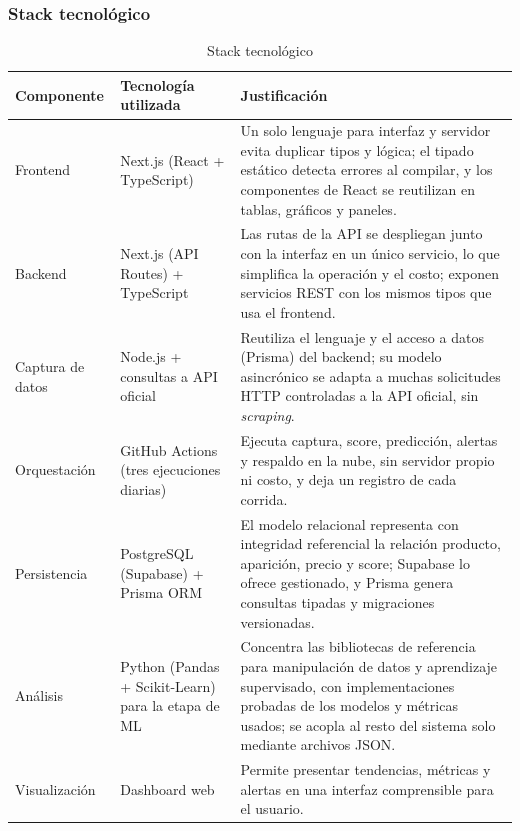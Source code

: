 \subsubsection{Stack tecnológico}\label{sec:stack-preliminar}

\begin{table}[ht]
	\centering
	\caption{Stack tecnológico}
	\label{tab:stack}
	\begin{tabularx}{\textwidth}{@{}>{\raggedright\arraybackslash}p{2.6cm} >{\raggedright\arraybackslash}p{4.2cm} X@{}}
		\toprule
		\textbf{Componente} & \textbf{Tecnología utilizada} & \textbf{Justificación} \\
		\midrule
		Frontend & Next.js (React + TypeScript) & Un solo lenguaje para interfaz y servidor evita duplicar tipos y lógica; el tipado estático detecta errores al compilar, y los componentes de React se reutilizan en tablas, gráficos y paneles. \\
		Backend & Next.js (API Routes) + TypeScript & Las rutas de la API se despliegan junto con la interfaz en un único servicio, lo que simplifica la operación y el costo; exponen servicios REST con los mismos tipos que usa el frontend. \\
		Captura de datos & Node.js + consultas a API oficial & Reutiliza el lenguaje y el acceso a datos (Prisma) del backend; su modelo asincrónico se adapta a muchas solicitudes HTTP controladas a la API oficial, sin \emph{scraping}. \\
		Orquestación & GitHub Actions (tres ejecuciones diarias) & Ejecuta captura, score, predicción, alertas y respaldo en la nube, sin servidor propio ni costo, y deja un registro de cada corrida. \\
		Persistencia & PostgreSQL (Supabase) + Prisma ORM & El modelo relacional representa con integridad referencial la relación producto, aparición, precio y score; Supabase lo ofrece gestionado, y Prisma genera consultas tipadas y migraciones versionadas. \\
		Análisis & Python (Pandas + Scikit-Learn) para la etapa de ML & Concentra las bibliotecas de referencia para manipulación de datos y aprendizaje supervisado, con implementaciones probadas de los modelos y métricas usados; se acopla al resto del sistema solo mediante archivos JSON. \\
		Visualización & Dashboard web & Permite presentar tendencias, métricas y alertas en una interfaz comprensible para el usuario. \\
		\bottomrule
	\end{tabularx}
\end{table}

